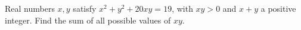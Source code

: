 Real numbers $ x,y $ satisfy $ x^2+y^2+20xy=19 $, with $ xy>0 $ and $ x+y $ a positive integer. Find the sum of all possible values of $ xy $.
